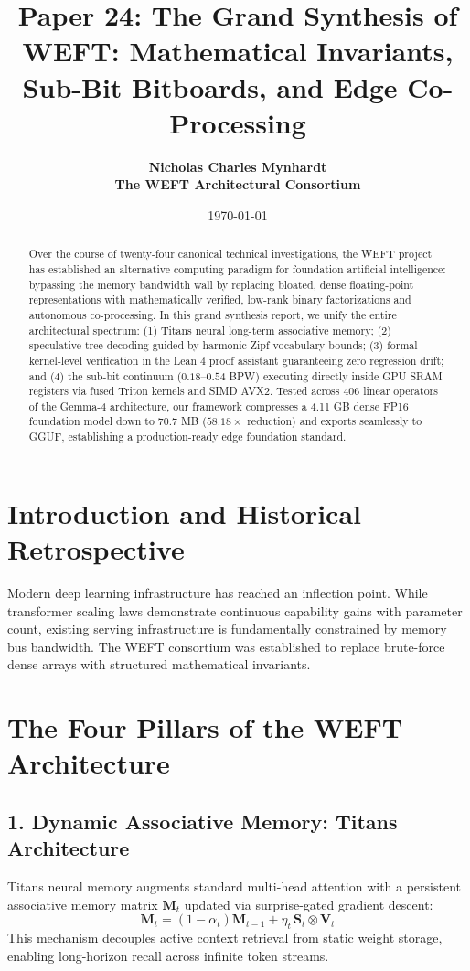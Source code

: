 \documentclass[11pt,a4paper]{article}
\title{\textbf{Paper 24: The Grand Synthesis of WEFT: Mathematical Invariants, Sub-Bit Bitboards, and Edge Co-Processing}}
\author{
  \textbf{Nicholas Charles Mynhardt} \\
  \textbf{The WEFT Architectural Consortium}
}
\date{\today}
\begin{document}
\maketitle

\begin{abstract}
Over the course of twenty-four canonical technical investigations, the WEFT project has established an alternative computing paradigm for foundation artificial intelligence: bypassing the memory bandwidth wall by replacing bloated, dense floating-point representations with mathematically verified, low-rank binary factorizations and autonomous co-processing. In this grand synthesis report, we unify the entire architectural spectrum: (1) Titans neural long-term associative memory; (2) speculative tree decoding guided by harmonic Zipf vocabulary bounds; (3) formal kernel-level verification in the Lean 4 proof assistant guaranteeing zero regression drift; and (4) the sub-bit continuum ($0.18$--$0.54$ BPW) executing directly inside GPU SRAM registers via fused Triton kernels and SIMD AVX2. Tested across 406 linear operators of the Gemma-4 architecture, our framework compresses a 4.11 GB dense FP16 foundation model down to 70.7 MB ($58.18\times$ reduction) and exports seamlessly to GGUF, establishing a production-ready edge foundation standard.
\end{abstract}

\section{Introduction and Historical Retrospective}
Modern deep learning infrastructure has reached an inflection point. While transformer scaling laws demonstrate continuous capability gains with parameter count, existing serving infrastructure is fundamentally constrained by memory bus bandwidth. The WEFT consortium was established to replace brute-force dense arrays with structured mathematical invariants.

\section{The Four Pillars of the WEFT Architecture}

\subsection{1. Dynamic Associative Memory: Titans Architecture}
Titans neural memory augments standard multi-head attention with a persistent associative memory matrix $\mathbf{M}_t$ updated via surprise-gated gradient descent:
\begin{equation}
\mathbf{M}_t = (1 - \alpha_t) \mathbf{M}_{t-1} + \eta_t \, \mathbf{S}_t \otimes \mathbf{V}_t
\end{equation}
This mechanism decouples active context retrieval from static weight storage, enabling long-horizon recall across infinite token streams.
\end{document}
